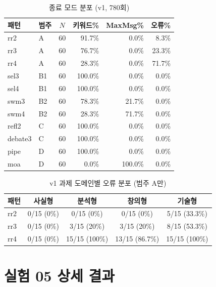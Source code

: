 \documentclass[a4paper,11pt]{article}
\begin{document}
\begin{table}[H]
\centering
\caption{종료 모드 분포 (v1, 780회)}
\label{tab:termination-modes}
{\small
\begin{tabular}{llcrrr}
\toprule
패턴 & 범주 & $N$ & 키워드\% & MaxMsg\% & 오류\% \\
\midrule
rr2     & A  & 60 & 91.7\%  & 0.0\%   & 8.3\% \\
rr3     & A  & 60 & 76.7\%  & 0.0\%   & 23.3\% \\
rr4     & A  & 60 & 28.3\%  & 0.0\%   & 71.7\% \\
sel3    & B1 & 60 & 100.0\% & 0.0\%   & 0.0\% \\
sel4    & B1 & 60 & 100.0\% & 0.0\%   & 0.0\% \\
swm3    & B2 & 60 & 78.3\%  & 21.7\%  & 0.0\% \\
swm4    & B2 & 60 & 28.3\%  & 71.7\%  & 0.0\% \\
refl2   & C  & 60 & 100.0\% & 0.0\%   & 0.0\% \\
debate3 & C  & 60 & 100.0\% & 0.0\%   & 0.0\% \\
pipe    & D  & 60 & 100.0\% & 0.0\%   & 0.0\% \\
moa     & D  & 60 & 0.0\%   & 100.0\% & 0.0\% \\
\bottomrule
\end{tabular}
}
\end{table}

\begin{table}[H]
\centering
\caption{v1 과제 도메인별 오류 분포 (범주 A만)}
\label{tab:error-by-domain}
{\small
\begin{tabular}{lcccc}
\toprule
패턴 & 사실형 & 분석형 & 창의형 & 기술형 \\
\midrule
rr2 & 0/15 (0\%) & 0/15 (0\%) & 0/15 (0\%) & 5/15 (33.3\%) \\
rr3 & 0/15 (0\%) & 3/15 (20\%) & 3/15 (20\%) & 8/15 (53.3\%) \\
rr4 & 0/15 (0\%) & 15/15 (100\%) & 13/15 (86.7\%) & 15/15 (100\%) \\
\bottomrule
\end{tabular}
}
\end{table}

\section{실험 05 상세 결과}
\label{app:exp05-details}
\end{document}
